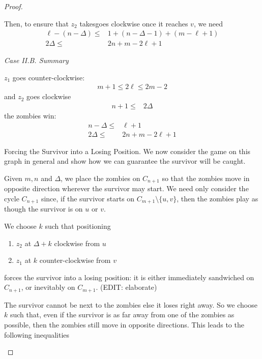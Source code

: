 \begin{proof}
\begin{proofpart}
  Then, to ensure that $z_2$ takesgoes clockwise once
  it reaches $v$, we need
  \begin{align*}
   \ell - (n - \Delta) \leq & 1 + (n - \Delta - 1) + (m - \ell + 1) \\
   2 \Delta \leq            & 2n + m - 2\ell + 1
  \end{align*}

  \textit{Case II.B. Summary}

  $z_1$ goes counter-clockwise:
  \begin{align*}
   m + 1 \leq 2 \ell \leq 2m - 2
  \end{align*}
  and $z_2$ goes clockwise
  \begin{align*}
   n+1 \leq & 2 \Delta
  \end{align*}
  the zombies win:
  \begin{align*}
   n - \Delta \leq & \ell + 1           \\
   2 \Delta \leq   & 2n + m - 2\ell + 1
  \end{align*}


 \end{proofpart}

 \begin{proofpart} Forcing the Survivor into a Losing Position.
  We now consider the game on this graph in general and show
  how we can guarantee the survivor will be caught.

  Given $m, n$ and $\Delta$, we place the
  zombies on $C_{n+1}$ so that the zombies move in
  opposite direction wherever the survivor may start.
  We need only consider the cycle $C_{n+1}$ since, if the survivor
  starts on $C_{m+1} \setminus \{u, v\}$, then the zombies play as
  though the survivor is on $u$ or $v$.

  We choose $k$ such that positioning
  \begin{enumerate}
   \item $z_2$ at $\Delta + k$ clockwise from $u$
   \item $z_1$ at $k$ counter-clockwise from $v$
  \end{enumerate}
  forces the survivor into a losing position: it is either immediately sandwiched on $C_{n+1}$, or inevitably on $C_{m+1}$. (EDIT: elaborate)

  The survivor cannot be next to the zombies else it loses right away.
  So we choose $k$ such that, even if the survivor is as far
  away from one of the zombies as possible, then the zombies still move in opposite directions. This leads to the following inequalities



\end{proofpart}
\end{proof}
